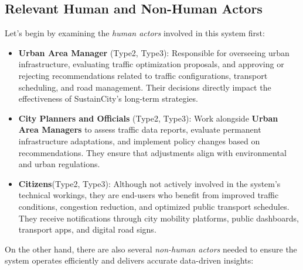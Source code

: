 \documentclass[a4paper,12pt]{article}
\begin{document}
\subsection{Relevant Human and Non-Human Actors}
Let's begin by examining the \textit{human actors} involved in this system first:
\begin{itemize}
    \item \textbf{Urban Area Manager} (Type2, Type3): Responsible for overseeing urban infrastructure, evaluating traffic optimization proposals, and approving or rejecting recommendations related to traffic configurations, transport scheduling, and road management. Their decisions directly impact the effectiveness of SustainCity’s long-term strategies.
    \item \textbf{City Planners and Officials} (Type2, Type3): Work alongside \textbf{Urban Area Managers} to assess traffic data reports, evaluate permanent infrastructure adaptations, and implement policy changes based on recommendations. They ensure that adjustments align with environmental and urban regulations.
    \item \textbf{Citizens}(Type2, Type3): Although not actively involved in the system’s technical workings, they are end-users who benefit from improved traffic conditions, congestion reduction, and optimized public transport schedules. They receive notifications through city mobility platforms, public dashboards, transport apps, and digital road signs.
\end{itemize}
\noindent On the other hand, there are also several \textit{non-human actors} needed to ensure the system operates efficiently and delivers accurate data-driven insights:
\end{document}
